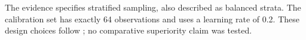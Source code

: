 The evidence specifies stratified sampling, also described as balanced strata.
The calibration set has exactly 64 observations and uses a learning rate of 0.2.
These design choices follow \cite{doe2024}; no comparative superiority claim was tested.
